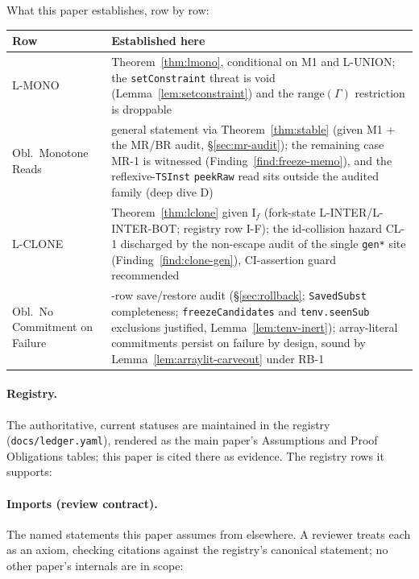 \documentclass[11pt]{article}
\newcommand{\Env}{\Gamma}
\begin{document}
What this paper establishes, row by row:

\begingroup
\renewcommand{\arraystretch}{1.25}
\small
\begin{tabular}{@{}>{\raggedright\arraybackslash}p{4.2cm}>{\raggedright\arraybackslash}p{9.4cm}@{}}
\toprule
\textbf{Row} & \textbf{Established here} \\
\midrule
L-MONO & Theorem~\ref{thm:lmono}, conditional on M1
  and L-UNION; the \texttt{setConstraint} threat is void
  (Lemma~\ref{lem:setconstraint}) and the $\mathrm{range}(\Env)$
  restriction is droppable \\
Obl.\ Monotone Reads & general statement via
  Theorem~\ref{thm:stable} (given M1 + the MR/BR audit,
  \S\ref{sec:mr-audit}); the remaining case MR-1 is witnessed
  (Finding~\ref{find:freeze-memo}), and the reflexive-\texttt{TSInst}
  \texttt{peekRaw} read sits outside the audited family (deep dive D) \\
L-CLONE & Theorem~\ref{thm:lclone} given I$_f$
  (fork-state L-INTER/L-INTER-BOT; registry row I-F); the id-collision hazard CL-1
  discharged by the non-escape audit of the single
  \texttt{gen*} site (Finding~\ref{find:clone-gen}), CI-assertion guard
  recommended \\
Obl.\ No Commitment on Failure & 14-row save/restore
  audit (\S\ref{sec:rollback}; \texttt{SavedSubst} completeness;
  \texttt{freezeCandidates} and \texttt{tenv.seenSub} exclusions
  justified, Lemma~\ref{lem:tenv-inert}); array-literal commitments
  persist on failure by design, sound by
  Lemma~\ref{lem:arraylit-carveout} under RB-1 \\
\bottomrule
\end{tabular}
\endgroup

\paragraph{Registry.}
The authoritative, current statuses are maintained in the registry
(\texttt{docs/ledger.yaml}), rendered as the main paper's Assumptions and
Proof Obligations tables; this paper is cited there as evidence. The
registry rows it supports:



\paragraph{Imports (review contract).}
The named statements this paper assumes from elsewhere. A reviewer treats
each as an axiom, checking citations against the registry's canonical
statement; no other paper's internals are in scope:
\end{document}
